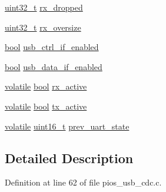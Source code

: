 \begin{DoxyCompactItemize}
\hyperlink{stdint_8h_a435d1572bf3f880d55459d9805097f62}{uint32\-\_\-t} \hyperlink{group___p_i_o_s___u_s_b___c_o_m_gaf423c6fd8c8e8d95b5dc5d9242df40da}{rx\-\_\-dropped}
\item 
\hyperlink{stdint_8h_a435d1572bf3f880d55459d9805097f62}{uint32\-\_\-t} \hyperlink{group___p_i_o_s___u_s_b___c_o_m_ga88576a84665e4d9b17001b7cb5efebc6}{rx\-\_\-oversize}
\item 
\hyperlink{group___exported__types_gaf6a258d8f3ee5206d682d799316314b1}{bool} \hyperlink{group___p_i_o_s___u_s_b___c_o_m_ga27ad044c09bb6b13874d1d1281aa397f}{usb\-\_\-ctrl\-\_\-if\-\_\-enabled}
\item 
\hyperlink{group___exported__types_gaf6a258d8f3ee5206d682d799316314b1}{bool} \hyperlink{group___p_i_o_s___u_s_b___c_o_m_gaa0a4b4afa2a6f6c20709f878b026ecc5}{usb\-\_\-data\-\_\-if\-\_\-enabled}
\item 
\hyperlink{group___c_m_s_i_s___core___instruction_interface_gad7d93af13046b0378601b85c8c16673b}{volatile} \hyperlink{group___exported__types_gaf6a258d8f3ee5206d682d799316314b1}{bool} \hyperlink{group___p_i_o_s___u_s_b___c_o_m_gad41e79606da14368c2716f4bc3c84618}{rx\-\_\-active}
\item 
\hyperlink{group___c_m_s_i_s___core___instruction_interface_gad7d93af13046b0378601b85c8c16673b}{volatile} \hyperlink{group___exported__types_gaf6a258d8f3ee5206d682d799316314b1}{bool} \hyperlink{group___p_i_o_s___u_s_b___c_o_m_ga5ebf71c716fc76c564cf8217adeb956c}{tx\-\_\-active}
\item 
\hyperlink{group___c_m_s_i_s___core___instruction_interface_gad7d93af13046b0378601b85c8c16673b}{volatile} \hyperlink{stdint_8h_a273cf69d639a59973b6019625df33e30}{uint16\-\_\-t} \hyperlink{group___p_i_o_s___u_s_b___c_o_m_ga945dfed2223e17061cb6e4257c2b2624}{prev\-\_\-uart\-\_\-state}
\end{DoxyCompactItemize}


\subsection{Detailed Description}


Definition at line 62 of file pios\-\_\-usb\-\_\-cdc.\-c.



